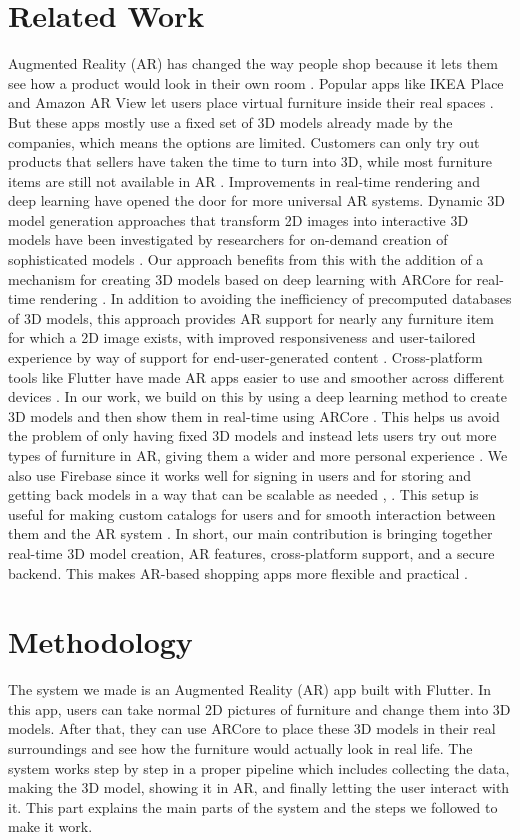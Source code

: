 \documentclass[conference]{IEEEtran}
\begin{document}
\section{Related Work}
Augmented Reality (AR) has changed the way people shop because it lets them see how a product would look in their own room \cite{ref1}. Popular apps like IKEA Place and Amazon AR View let users place virtual furniture inside their real spaces \cite{ref7}. But these apps mostly use a fixed set of 3D models already made by the companies, which means the options are limited. Customers can only try out products that sellers have taken the time to turn into 3D, while most furniture items are still not available in AR \cite{ref14}. Improvements in real-time rendering and deep learning have opened the door for more universal AR systems. Dynamic 3D model generation approaches that transform 2D images into interactive 3D models have been investigated by researchers for on-demand creation of sophisticated models \cite{ref12}. Our approach benefits from this with the addition of a mechanism for creating 3D models based on deep learning with ARCore for real-time rendering \cite{ref2}. In addition to avoiding the inefficiency of precomputed databases of 3D models, this approach provides AR support for nearly any furniture item for which a 2D image exists, with improved responsiveness and user-tailored experience by way of support for end-user-generated content \cite{ref5}. Cross-platform tools like Flutter have made AR apps easier to use and smoother across different devices \cite{ref9}. In our work, we build on this by using a deep learning method to create 3D models and then show them in real-time using ARCore \cite{ref2}. This helps us avoid the problem of only having fixed 3D models and instead lets users try out more types of furniture in AR, giving them a wider and more personal experience \cite{ref5}. We also use Firebase since it works well for signing in users and for storing and getting back models in a way that can be scalable as needed \cite{ref4}, \cite{ref10}. This setup is useful for making custom catalogs for users and for smooth interaction between them and the AR system \cite{ref20}. In short, our main contribution is bringing together real-time 3D model creation, AR features, cross-platform support, and a secure backend. This makes AR-based shopping apps more flexible and practical \cite{ref17}.

\section{Methodology}
The system we made is an Augmented Reality (AR) app built with Flutter. In this app, users can take normal 2D pictures of furniture and change them into 3D models. After that, they can use ARCore \cite{ref2} to place these 3D models in their real surroundings and see how the furniture would actually look in real life. The system works step by step in a proper pipeline which includes collecting the data, making the 3D model, showing it in AR, and finally letting the user interact with it. This part explains the main parts of the system and the steps we followed to make it work.
\end{document}
